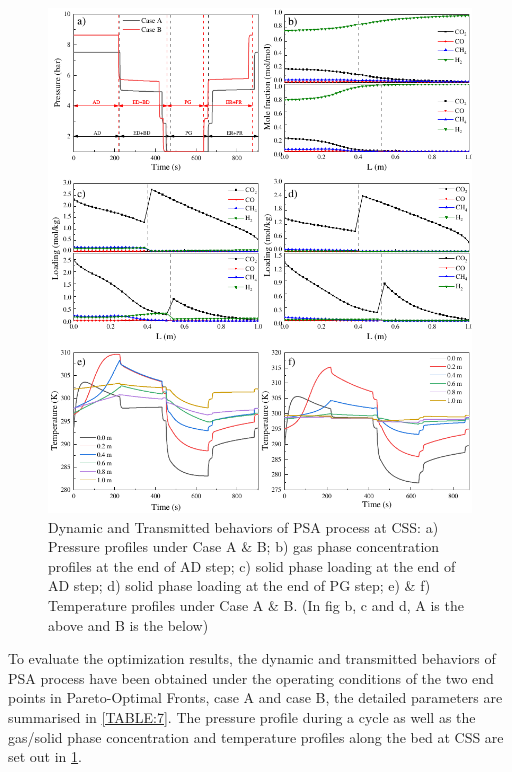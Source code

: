 \documentclass[preprint,12pt]{elsarticle}
\begin{document}
\begin{figure}
	\centering
	\includegraphics[width=1\textwidth]{figs/Fig11.pdf}
	\caption{Dynamic and Transmitted behaviors of PSA process at CSS: a) Pressure profiles under Case A \& B; b) gas phase concentration profiles at the end of AD step; c) solid phase loading at the end of AD step; d) solid phase loading at the end of PG step; e) \& f) Temperature profiles under Case A \& B. (In fig b, c and d, A is the above and B is the below)}
	\label{FIG:11}
\end{figure}
To evaluate the optimization results, the dynamic and transmitted behaviors of PSA process have been obtained under the operating conditions of the two end points in Pareto-Optimal Fronts, case A and case B, the detailed parameters are summarised in \cref{TABLE:7}. The pressure profile during a cycle as well as the gas/solid phase concentration and temperature profiles along the bed at CSS are set out in \cref{FIG:11}.
\end{document}
